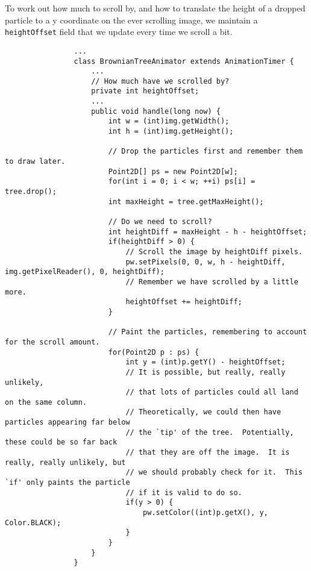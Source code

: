 \documentclass{article}
\begin{document}
            To work out how much to scroll by, and how to translate the height of a dropped particle to a y coordinate on the ever
            scrolling image, we maintain a \texttt{heightOffset} field that we update every time we scroll a bit.
            
            \begin{verbatim}
                ...            
                class BrownianTreeAnimator extends AnimationTimer {
                    ...
                    // How much have we scrolled by?
                    private int heightOffset;
                    ...
                    public void handle(long now) {
                        int w = (int)img.getWidth();
                        int h = (int)img.getHeight();
        
                        // Drop the particles first and remember them to draw later.
                        Point2D[] ps = new Point2D[w];
                        for(int i = 0; i < w; ++i) ps[i] = tree.drop();
                        int maxHeight = tree.getMaxHeight();
        
                        // Do we need to scroll?
                        int heightDiff = maxHeight - h - heightOffset;
                        if(heightDiff > 0) {
                            // Scroll the image by heightDiff pixels.
                            pw.setPixels(0, 0, w, h - heightDiff, img.getPixelReader(), 0, heightDiff);
                            // Remember we have scrolled by a little more.
                            heightOffset += heightDiff; 
                        }

                        // Paint the particles, remembering to account for the scroll amount.
                        for(Point2D p : ps) {
                            int y = (int)p.getY() - heightOffset;
                            // It is possible, but really, really unlikely, 
                            // that lots of particles could all land on the same column.
                            // Theoretically, we could then have particles appearing far below 
                            // the `tip' of the tree.  Potentially, these could be so far back
                            // that they are off the image.  It is really, really unlikely, but
                            // we should probably check for it.  This `if' only paints the particle
                            // if it is valid to do so.
                            if(y > 0) {
                                pw.setColor((int)p.getX(), y, Color.BLACK);
                            }
                        }
                    }
                }
            \end{verbatim}
\end{document}
